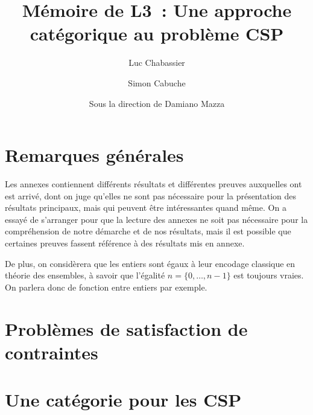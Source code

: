 \documentclass[12pt]{article}
\title{Mémoire de L3~: Une approche catégorique au problème CSP}
\author{Luc Chabassier\and Simon Cabuche}
\date{\small Sous la direction de Damiano Mazza}
\begin{document}
\maketitle

\newpage
\tableofcontents
\newpage

\section*{Remarques générales}

Les annexes contiennent différents résultats et différentes preuves auxquelles
ont est arrivé, dont on juge qu'elles ne sont pas nécessaire pour la
présentation des résultats principaux, mais qui peuvent être intéressantes
quand même. On a essayé de s'arranger pour que la lecture des annexes ne soit
pas nécessaire pour la compréhension de notre démarche et de nos résultats,
mais il est possible que certaines preuves fassent référence à des résultats
mis en annexe.

De plus, on considèrera que les entiers sont égaux à leur encodage classique en théorie
des ensembles, à savoir que l'égalité $n = \{0, \dots, n-1\}$ est toujours vraies. On
parlera donc de fonction entre entiers par exemple.


\section{Problèmes de satisfaction de contraintes}\label{secCSP}


\section{Une catégorie pour les CSP}\label{secCat}

\end{document}
